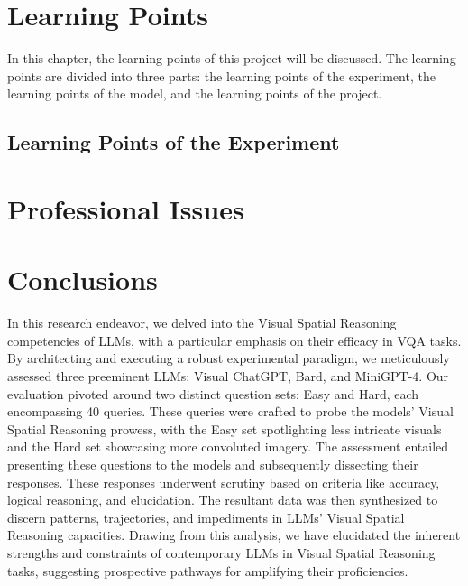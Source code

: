 \documentclass[twocolumn,11pt]{report}
\begin{document}

\chapter{Learning Points}\label{chap:learning}
In this chapter, the learning points of this project will be discussed. The learning points are divided into three parts: the learning points of the experiment, the learning points of the model, and the learning points of the project.

\section{Learning Points of the Experiment}

\chapter{Professional Issues}\label{chap:issues}

\chapter{Conclusions}\label{chap:conclusions}
In this research endeavor, we delved into the Visual Spatial Reasoning competencies of LLMs, with a particular emphasis on their efficacy in VQA tasks. By architecting and executing a robust experimental paradigm, we meticulously assessed three preeminent LLMs: Visual ChatGPT, Bard, and MiniGPT-4. Our evaluation pivoted around two distinct question sets: Easy and Hard, each encompassing 40 queries. These queries were crafted to probe the models' Visual Spatial Reasoning prowess, with the Easy set spotlighting less intricate visuals and the Hard set showcasing more convoluted imagery. The assessment entailed presenting these questions to the models and subsequently dissecting their responses. These responses underwent scrutiny based on criteria like accuracy, logical reasoning, and elucidation. The resultant data was then synthesized to discern patterns, trajectories, and impediments in LLMs' Visual Spatial Reasoning capacities. Drawing from this analysis, we have elucidated the inherent strengths and constraints of contemporary LLMs in Visual Spatial Reasoning tasks, suggesting prospective pathways for amplifying their proficiencies.
\end{document}
